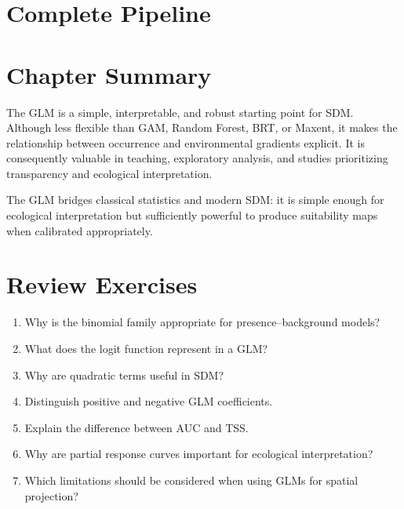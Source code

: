 \section{Complete Pipeline}

\section{Chapter Summary}

The GLM is a simple, interpretable, and robust starting point for SDM. Although
less flexible than GAM, Random Forest, BRT, or Maxent, it makes the relationship
between occurrence and environmental gradients explicit. It is consequently
valuable in teaching, exploratory analysis, and studies prioritizing
transparency and ecological interpretation.

\begin{conceito}[title={\faBook\quad Key message}]
The GLM bridges classical statistics and modern SDM: it is simple enough for
ecological interpretation but sufficiently powerful to produce suitability
maps when calibrated appropriately.
\end{conceito}

\section{Review Exercises}
\begin{enumerate}
  \item Why is the binomial family appropriate for presence--background models?
  \item What does the logit function represent in a GLM?
  \item Why are quadratic terms useful in SDM?
  \item Distinguish positive and negative GLM coefficients.
  \item Explain the difference between AUC and TSS.
  \item Why are partial response curves important for ecological interpretation?
  \item Which limitations should be considered when using GLMs for spatial projection?
\end{enumerate}
